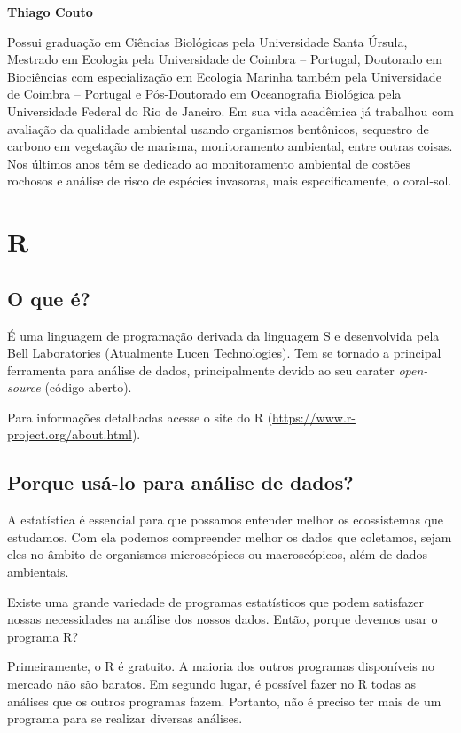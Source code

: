 \documentclass[14pt,titlepage, oneside, openany, a4paper]{book}
\begin{document}
\textbf{Thiago Couto}

Possui graduação em Ciências Biológicas pela Universidade Santa Úrsula, Mestrado em Ecologia pela Universidade de Coimbra -- Portugal, Doutorado em Biociências com especialização em Ecologia Marinha também pela Universidade de Coimbra -- Portugal e Pós-Doutorado em Oceanografia Biológica pela Universidade Federal do Rio de Janeiro. Em sua vida acadêmica já trabalhou com avaliação da qualidade ambiental usando organismos bentônicos, sequestro de carbono em vegetação de marisma, monitoramento ambiental, entre outras coisas. Nos últimos anos têm se dedicado ao monitoramento ambiental de costões rochosos e análise de risco de espécies invasoras, mais especificamente, o coral-sol.

\hypertarget{r}{%
\chapter{R}\label{r}}

\hypertarget{o-que-uxe9}{%
\section{O que é?}\label{o-que-uxe9}}

É uma linguagem de programação derivada da linguagem S e desenvolvida pela Bell Laboratories (Atualmente Lucen Technologies). Tem se tornado a principal ferramenta para análise de dados, principalmente devido ao seu carater \emph{open-source} (código aberto).

Para informações detalhadas acesse o site do R (\url{https://www.r-project.org/about.html}).

\hypertarget{porque-usuxe1-lo-para-anuxe1lise-de-dados}{%
\section{Porque usá-lo para análise de dados?}\label{porque-usuxe1-lo-para-anuxe1lise-de-dados}}

A estatística é essencial para que possamos entender melhor os ecossistemas que estudamos. Com ela podemos compreender melhor os dados que coletamos, sejam eles no âmbito de organismos microscópicos ou macroscópicos, além de dados ambientais.

Existe uma grande variedade de programas estatísticos que podem satisfazer nossas necessidades na análise dos nossos dados. Então, porque devemos usar o programa R?

Primeiramente, o R é gratuito. A maioria dos outros programas disponíveis no mercado não são baratos. Em segundo lugar, é possível fazer no R todas as análises que os outros programas fazem. Portanto, não é preciso ter mais de um programa para se realizar diversas análises.
\end{document}
